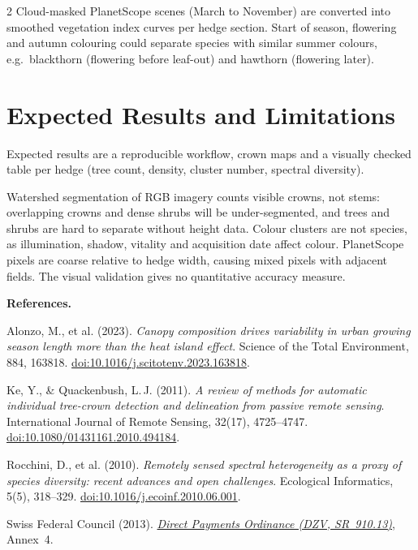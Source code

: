 \documentclass[10pt,a4paper]{article}
\begin{document}
\begin{multicols}{2}
Cloud-masked PlanetScope scenes (March to November)
are converted into smoothed vegetation index curves
per hedge section. Start of season, flowering and
autumn colouring could separate species with similar
summer colours, e.g.\ blackthorn (flowering before
leaf-out) and hawthorn (flowering later).


\section*{Expected Results and Limitations}

Expected results are a reproducible workflow, crown
maps and a visually checked table per hedge (tree
count, density, cluster number, spectral diversity).

Watershed segmentation of RGB imagery counts visible
crowns, not stems: overlapping crowns and dense shrubs
will be under-segmented, and trees and shrubs are hard
to separate without height data. Colour
clusters are not species, as illumination, shadow,
vitality and acquisition date affect colour.
PlanetScope pixels are coarse relative to hedge width,
causing mixed pixels with adjacent fields. The visual
validation gives no quantitative accuracy measure.

{\footnotesize
\textbf{References.}

Alonzo, M., et al. (2023).
\emph{Canopy composition drives variability in urban
growing season length more than the heat island
effect}.
Science of the Total Environment, 884, 163818.
\href{https://doi.org/10.1016/j.scitotenv.2023.163818}
{doi:10.1016/j.scitotenv.2023.163818}.

Ke, Y., \& Quackenbush, L.\,J. (2011).
\emph{A review of methods for automatic individual
tree-crown detection and delineation from passive
remote sensing}.
International Journal of Remote Sensing, 32(17),
4725--4747.
\href{https://doi.org/10.1080/01431161.2010.494184}
{doi:10.1080/01431161.2010.494184}.

Rocchini, D., et al. (2010).
\emph{Remotely sensed spectral heterogeneity as a
proxy of species diversity: recent advances and open
challenges}.
Ecological Informatics, 5(5), 318--329.
\href{https://doi.org/10.1016/j.ecoinf.2010.06.001}
{doi:10.1016/j.ecoinf.2010.06.001}.

Swiss Federal Council (2013).
\href{https://www.fedlex.admin.ch/eli/cc/2013/765/de}
{\emph{Direct Payments Ordinance (DZV, SR~910.13)}},
Annex~4.
}

\end{multicols}
\end{document}
